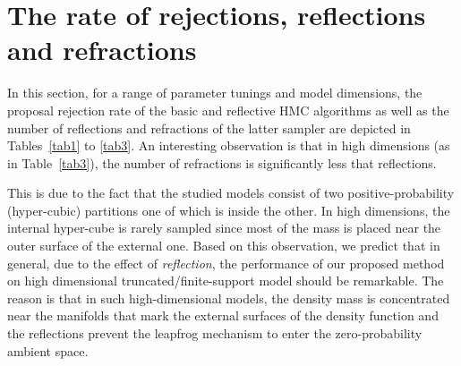\documentclass{article} %
\begin{document}
\newpage 
\section{The rate of rejections, reflections and refractions}
In this section, for a range of parameter tunings and model dimensions, the proposal rejection rate of the basic and reflective HMC algorithms as well as the number of reflections and refractions of the latter sampler are depicted in Tables~\ref{tab1} to \ref{tab3}. 
An interesting observation is that in high dimensions (as in Table~\ref{tab3}), the number of refractions is significantly less that reflections. 

This is due to the fact that the studied models consist of  two positive-probability (hyper-cubic) partitions one of which is inside the other. 
In high dimensions, the internal hyper-cube is rarely sampled since most of the mass is placed near the outer surface of the external one. 
Based on this observation, we predict that in general, due to the effect of \emph{reflection}, the performance of our proposed method on high dimensional truncated/finite-support model should be remarkable.
The reason is that in such high-dimensional models, the density mass is concentrated near the manifolds that mark the external surfaces of the density function and the reflections prevent the leapfrog mechanism to enter the zero-probability ambient space. 
\end{document}
